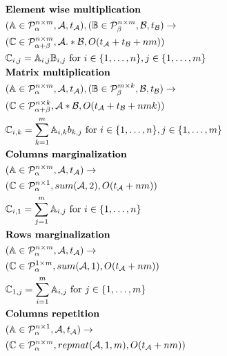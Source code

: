 \documentclass{article}
\begin{document}
\begin{figure}
\begin{framed}
\begin{align*}
&\text{{\bf Element wise multiplication}}\\
&(\mathbb{A} \in \mathcal{P}^{n \times m}_\alpha, \mathcal{A}, t_\mathcal{A}), (\mathbb{B} \in \mathcal{P}^{n \times m}_\beta, \mathcal{B}, t_\mathcal{B}) \rightarrow \\ 
&(\mathbb{C} \in \mathcal{P}^{n \times m}_{\alpha + \beta}, \mathcal{A} .* \mathcal{B}, O(t_\mathcal{A} + t_\mathcal{B} + nm)) \\
&\mathbb{C}_{i,j} = \mathbb{A}_{i,j}\mathbb{B}_{i, j} \text{ for } i \in \{1, \dots, n\}, j \in \{1, \dots, m\} \\
&\text{{\bf Matrix multiplication}}\\
&(\mathbb{A} \in \mathcal{P}^{n \times m}_\alpha, \mathcal{A}, t_\mathcal{A}), (\mathbb{B} \in \mathcal{P}^{m \times k}_\beta, \mathcal{B}, t_\mathcal{B}) \rightarrow \\ 
&(\mathbb{C} \in \mathcal{P}^{n \times k}_{\alpha + \beta}, \mathcal{A} * \mathcal{B}, O(t_\mathcal{A} + t_\mathcal{B} + nmk)) \\
&\mathbb{C}_{i,k} = \sum_{k = 1}^m \mathbb{A}_{i,k}b_{k, j} \text{ for } i \in \{1, \dots, n\}, j \in \{1, \dots, m\} \\
&\text{{\bf Columns marginalization}}\\
&(\mathbb{A} \in \mathcal{P}^{n \times m}_\alpha, \mathcal{A}, t_\mathcal{A}) \rightarrow \\ 
&(\mathbb{C} \in \mathcal{P}^{n \times 1}_\alpha, sum(\mathcal{A}, 2), O(t_\mathcal{A} + nm)) \\
&\mathbb{C}_{i, 1} = \sum_{j = 1}^m \mathbb{A}_{i, j} \text{ for } i \in \{1, \dots, n\}\\
&\text{{\bf Rows marginalization}}\\
&(\mathbb{A} \in \mathcal{P}^{n \times m}_\alpha, \mathcal{A}, t_\mathcal{A}) \rightarrow \\ 
&(\mathbb{C} \in \mathcal{P}^{1 \times m}_\alpha, sum(\mathcal{A}, 1), O(t_\mathcal{A} + nm)) \\
&\mathbb{C}_{1, j} = \sum_{i = 1}^m \mathbb{A}_{i, j} \text{ for } j \in \{1, \dots, m\}\\
&\text{{\bf Columns repetition}}\\
&(\mathbb{A} \in \mathcal{P}^{n \times 1}_\alpha, \mathcal{A}, t_\mathcal{A}) \rightarrow \\ 
&(\mathbb{C} \in \mathcal{P}^{n \times m}_\alpha, repmat(\mathcal{A}, 1, m), O(t_\mathcal{A} + nm)) \\

\end{align*}
\end{framed}
\end{figure}
\end{document}
